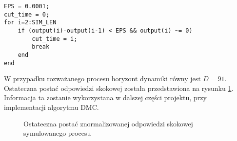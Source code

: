 \begin{lstlisting}[style=customc,frame=single,label={zad3_lst},caption={Opis automatycznego skracania odpowiedzi skokowej},captionpos=b] 
EPS = 0.0001;
cut_time = 0;
for i=2:SIM_LEN
    if (output(i)-output(i-1) < EPS && output(i) ~= 0)
        cut_time = i;
        break
    end
end
\end{lstlisting}


W przypadku rozważanego procesu horyzont dynamiki równy jest $D=\num{91}$. Ostateczna 
postać odpowiedzi skokowej została przedstawiona na rysunku \ref{zad3_obcieta_norm_odp}.
Informacja ta zostanie wykorzystana w dalszej części projektu, przy implementacji
algorytmu DMC.

\begin{figure}[b]
    \label{zad3_obcieta_norm_odp}
    \centering
    \caption{Ostateczna postać znormalizowanej odpowiedzi skokowej symulowanego procesu}
\end{figure}